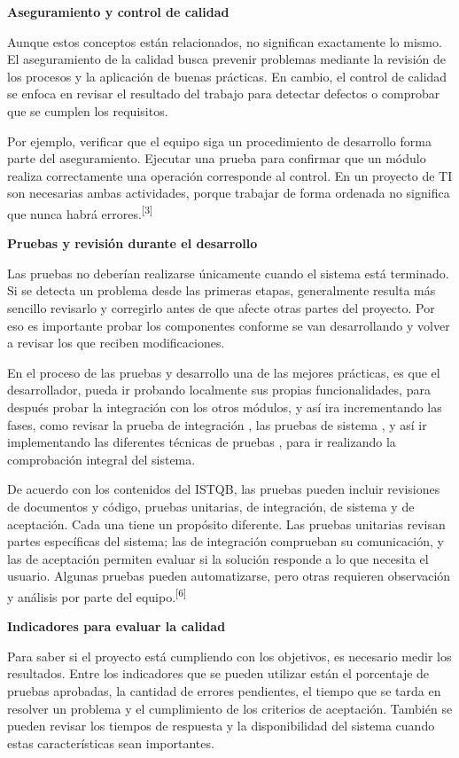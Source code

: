 \documentclass[12pt]{article}
\begin{document}
\noindent\textbf{Aseguramiento y control de calidad}

Aunque estos conceptos están relacionados, no significan exactamente lo
mismo. El aseguramiento de la calidad busca prevenir problemas mediante la
revisión de los procesos y la aplicación de buenas prácticas. En cambio, el
control de calidad se enfoca en revisar el resultado del trabajo para
detectar defectos o comprobar que se cumplen los requisitos.

Por ejemplo, verificar que el equipo siga un procedimiento de desarrollo
forma parte del aseguramiento. Ejecutar una prueba para confirmar que un
módulo realiza correctamente una operación corresponde al control. En un
proyecto de TI son necesarias ambas actividades, porque trabajar de forma
ordenada no significa que nunca habrá errores.\textsuperscript{[3]}

\noindent\textbf{Pruebas y revisión durante el desarrollo}

Las pruebas no deberían realizarse únicamente cuando el sistema está
terminado. Si se detecta un problema desde las primeras etapas, generalmente
resulta más sencillo revisarlo y corregirlo antes de que afecte otras partes
del proyecto. Por eso es importante probar los componentes conforme se van
desarrollando y volver a revisar los que reciben modificaciones.

En el proceso de las pruebas y desarrollo una de las mejores prácticas, es que el desarrollador, pueda ir probando localmente sus propias funcionalidades, para después probar la integración con los otros módulos, y así ira incrementando las fases, como revisar la prueba de integración , las pruebas de sistema , y así ir implementando las diferentes técnicas de pruebas , para ir realizando la comprobación integral del sistema.

De acuerdo con los contenidos del ISTQB, las pruebas pueden incluir revisiones
de documentos y código, pruebas unitarias, de integración, de sistema y de
aceptación. Cada una tiene un propósito diferente. Las pruebas unitarias
revisan partes específicas del sistema; las de integración comprueban su
comunicación, y las de aceptación permiten evaluar si la solución responde a
lo que necesita el usuario. Algunas pruebas pueden automatizarse, pero otras
requieren observación y análisis por parte del equipo.\textsuperscript{[6]}

\noindent\textbf{Indicadores para evaluar la calidad}

Para saber si el proyecto está cumpliendo con los objetivos, es necesario
medir los resultados. Entre los indicadores que se pueden utilizar están el
porcentaje de pruebas aprobadas, la cantidad de errores pendientes, el tiempo
que se tarda en resolver un problema y el cumplimiento de los criterios de
aceptación. También se pueden revisar los tiempos de respuesta y la
disponibilidad del sistema cuando estas características sean importantes.
\end{document}
